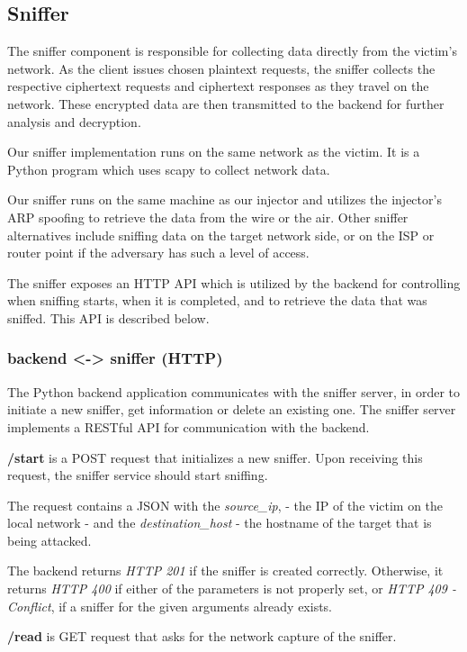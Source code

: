 \subsection{Sniffer}

The sniffer component is responsible for collecting data directly from the
victim's network. As the client issues chosen plaintext requests, the sniffer
collects the respective ciphertext requests and ciphertext responses as they
travel on the network. These encrypted data are then transmitted to the backend
for further analysis and decryption.

Our sniffer implementation runs on the same network as the victim. It is a
Python program which uses scapy \cite{scapy} to
collect network data.

Our sniffer runs on the same machine as our injector and utilizes the
injector's ARP spoofing to retrieve the data from the wire or the air. 
Other sniffer alternatives include sniffing data on the target network side, or
on the ISP or router point if the adversary has such a level of access.

The sniffer exposes an HTTP API which is utilized by the backend for
controlling when sniffing starts, when it is completed, and to retrieve the
data that was sniffed. This API is described below.


\subsubsection{backend <-> sniffer (HTTP)}

The Python backend application communicates with the sniffer server, in order
to initiate a new sniffer, get information or delete an existing one. The  sniffer 
server implements a RESTful API for communication with the backend.

\textbf{/start} is a POST request that initializes a new sniffer.
Upon receiving this request, the sniffer service should start sniffing.

The request contains a JSON with the \textit{source\_ip}, 
- the IP of the victim on the local network - and the \textit{destination\_host}
- the hostname of the target that is being attacked.

The backend returns \textit{HTTP 201} if the sniffer is created correctly. Otherwise, it returns
\textit{HTTP 400} if either of the parameters is not properly set, or \textit{HTTP 409 -
Conflict}, if a sniffer for the given arguments already exists.

\textbf{/read} is GET request that asks for the network capture of the sniffer.

